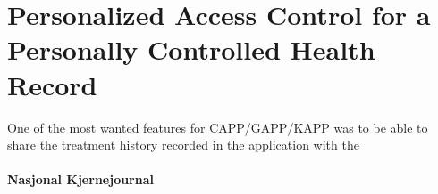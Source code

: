\section{Personalized Access Control for a Personally Controlled Health Record}
\label{personalhealthrecords}

One of the most wanted features for CAPP/GAPP/KAPP was to be able to share the treatment history recorded in the application with the 


\paragraph{Nasjonal Kjernejournal}
